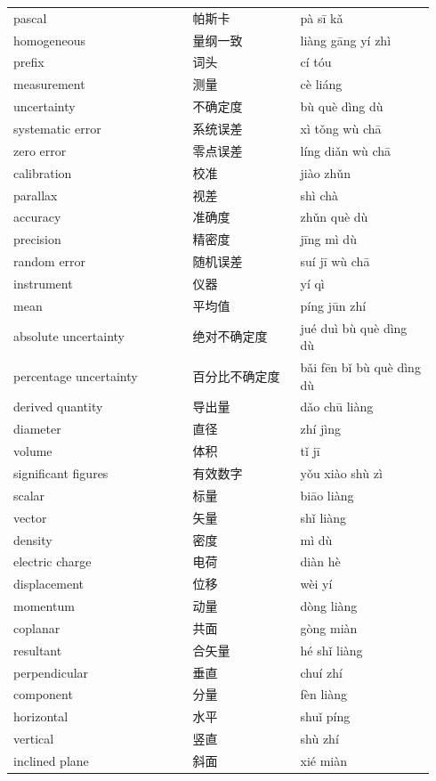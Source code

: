 \documentclass[11pt]{article}
\begin{document}
\begin{longtable}{@{}p{0.40\linewidth}p{0.24\linewidth}p{0.30\linewidth}@{}}
pascal & 帕斯卡 & pà sī kǎ \\
homogeneous & 量纲一致 & liàng gāng yí zhì \\
prefix & 词头 & cí tóu \\
measurement & 测量 & cè liáng \\
uncertainty & 不确定度 & bù què dìng dù \\
systematic error & 系统误差 & xì tǒng wù chā \\
zero error & 零点误差 & líng diǎn wù chā \\
calibration & 校准 & jiào zhǔn \\
parallax & 视差 & shì chà \\
accuracy & 准确度 & zhǔn què dù \\
precision & 精密度 & jīng mì dù \\
random error & 随机误差 & suí jī wù chā \\
instrument & 仪器 & yí qì \\
mean & 平均值 & píng jūn zhí \\
absolute uncertainty & 绝对不确定度 & jué duì bù què dìng dù \\
percentage uncertainty & 百分比不确定度 & bǎi fēn bǐ bù què dìng dù \\
derived quantity & 导出量 & dǎo chū liàng \\
diameter & 直径 & zhí jìng \\
volume & 体积 & tǐ jī \\
significant figures & 有效数字 & yǒu xiào shù zì \\
scalar & 标量 & biāo liàng \\
vector & 矢量 & shǐ liàng \\
density & 密度 & mì dù \\
electric charge & 电荷 & diàn hè \\
displacement & 位移 & wèi yí \\
momentum & 动量 & dòng liàng \\
coplanar & 共面 & gòng miàn \\
resultant & 合矢量 & hé shǐ liàng \\
perpendicular & 垂直 & chuí zhí \\
component & 分量 & fèn liàng \\
horizontal & 水平 & shuǐ píng \\
vertical & 竖直 & shù zhí \\
inclined plane & 斜面 & xié miàn \\
\end{longtable}
\end{document}
